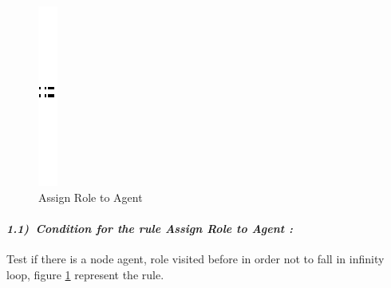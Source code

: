 \vspace{1cm}
\begin{figure}[th]
\centering
		\quad{}
		\includegraphics{ch3/img/sep}
		\quad{}
\caption{\label{fig:Create link between Agent and Role}Assign Role to Agent } 
\end{figure}
 

\paragraph{\emph{1.1)~Condition for the rule Assign Role to Agent  :  } } 
 
Test if there is a node agent, role visited before 
in order not to fall in infinity loop, figure \ref{fig:Create link between Agent and Role} represent the rule.
 

